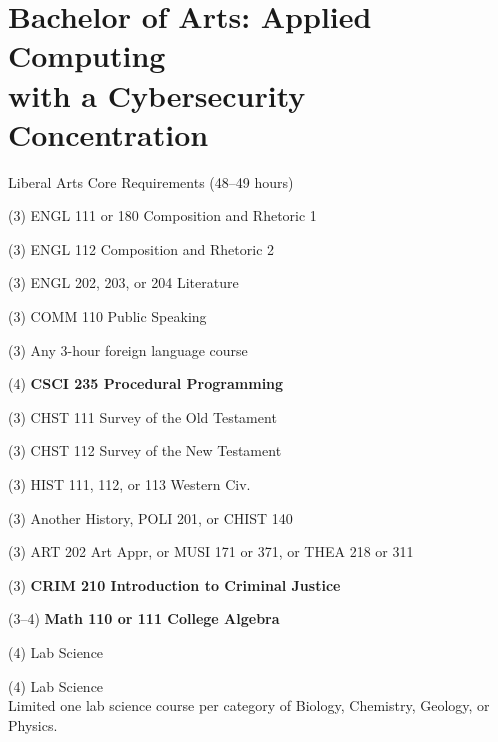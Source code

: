 %
\section*{Bachelor of Arts: Applied Computing\\with a Cybersecurity Concentration}

\begin{reqgroup}{Liberal Arts Core Requirements (48--49 hours)}
\begin{checklist}
\begin{minipage}[t]{0.5\linewidth}
	\item (3) ENGL 111 or 180 Composition and Rhetoric 1
	\item (3) ENGL 112 Composition and Rhetoric 2
	\item (3) ENGL 202, 203, or 204 Literature
	\item (3) COMM 110 Public Speaking
	\item (3) Any 3-hour foreign language course
	\item (4) \textbf{CSCI 235  Procedural Programming}
	\item (3) CHST 111  Survey of the Old Testament
	\item (3) CHST 112  Survey of the New Testament
	\item (3) HIST 111, 112, or 113 Western Civ.
\end{minipage}
\begin{minipage}[t]{0.5\linewidth}
	\item (3)	Another History, POLI 201, or CHIST 140
	\item (3)	ART 202 Art Appr, or MUSI 171 or 371, or THEA 218 or 311
	\item (3)	\textbf{CRIM 210 Introduction to Criminal Justice}
	\item (3--4)	\textbf{Math 110 or 111 College Algebra}
	\item (4)	Lab Science
	\item (4)	Lab Science\\Limited one lab science course per category of Biology, Chemistry,
Geology, or Physics.
\end{minipage}
\end{checklist}
\end{reqgroup}

